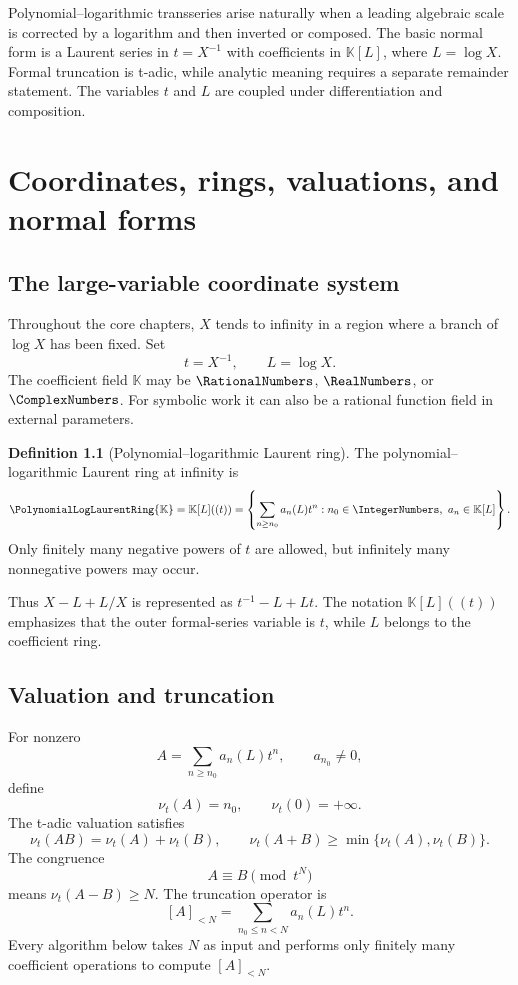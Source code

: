 \documentclass[11pt,openany]{book}
\theoremstyle{definition}
\newtheorem{definition}{Definition}[chapter]
\theoremstyle{plain}
\theoremstyle{remark}
\newcommand{\K}{\mathbb{K}}
\newcommand{\val}{\nu}
\begin{document}
\begin{summarybox}
Polynomial--logarithmic transseries arise naturally when a leading algebraic
scale is corrected by a logarithm and then inverted or composed.  The basic
normal form is a Laurent series in \(t=X^{-1}\) with coefficients in
\(\K[L]\), where \(L=\log X\).  Formal truncation is t-adic, while analytic
meaning requires a separate remainder statement.  The variables \(t\) and
\(L\) are coupled under differentiation and composition.
\end{summarybox}

\chapter{Coordinates, rings, valuations, and normal forms}\label{ch:coordinates}

\section{The large-variable coordinate system}
Throughout the core chapters, \(X\) tends to infinity in a region where a
branch of \(\log X\) has been fixed.  Set
\begin{equation}\label{eq:qL-def}
 t=X^{-1},\qquad L=\log X.
\end{equation}
The coefficient field \(\K\) may be \(\RationalNumbers\), \(\RealNumbers\), or \(\ComplexNumbers\).  For symbolic
work it can also be a rational function field in external parameters.

\begin{definition}[Polynomial--logarithmic Laurent ring]\label{def:PL-ring}
The polynomial--logarithmic Laurent ring at infinity is
\begin{equation}\label{eq:PL-ring}
 \PolynomialLogLaurentRing{\K}=\K[L]((t))
 =\left\{\sum_{n\ge n_0}a_n(L)t^n:
 n_0\in\IntegerNumbers,\ a_n\in\K[L]\right\}.
\end{equation}
Only finitely many negative powers of \(t\) are allowed, but infinitely many
nonnegative powers may occur.
\end{definition}
Thus \(X-L+L/X\) is represented as \(t^{-1}-L+Lt\).  The notation
\(\K[L]((t))\) emphasizes that the outer formal-series variable is \(t\), while
\(L\) belongs to the coefficient ring.

\section{Valuation and truncation}
For nonzero
\[
 A=\sum_{n\ge n_0}a_n(L)t^n,
 \qquad a_{n_0}\ne0,
\]
define
\begin{equation}\label{eq:qvaluation}
 \val_t(A)=n_0,
 \qquad \val_t(0)=+\infty.
\end{equation}
The t-adic valuation satisfies
\[
 \val_t(AB)=\val_t(A)+\val_t(B),
 \qquad
 \val_t(A+B)\ge\min\{\val_t(A),\val_t(B)\}.
\]
The congruence
\[
 A\equiv B\pmod{t^N}
\]
means \(\val_t(A-B)\ge N\).  The truncation operator is
\begin{equation}\label{eq:truncation}
 [A]_{<N}=\sum_{n_0\le n<N}a_n(L)t^n.
\end{equation}
Every algorithm below takes \(N\) as input and performs only finitely many
coefficient operations to compute \([A]_{<N}\).
\end{document}
